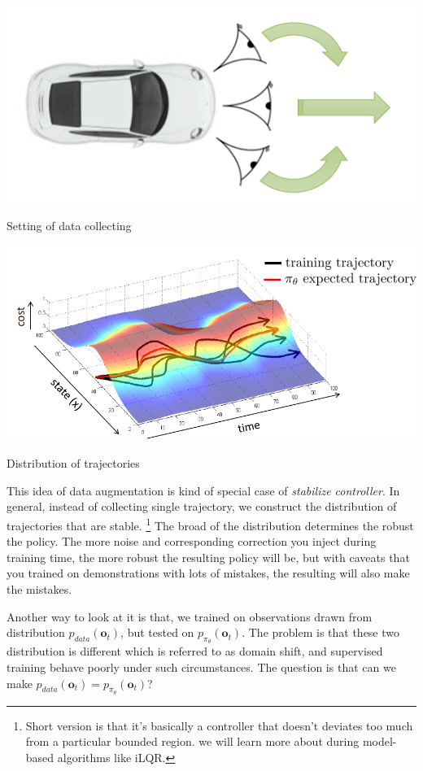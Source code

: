 \documentclass[nobib]{tufte-handout}
\begin{document}
\begin{marginfigure}
  \centering
  \includegraphics[width=\linewidth]{data-aug}
  \caption{Setting of data collecting}
  \label{fig:data-aug}
\end{marginfigure}

\begin{marginfigure}
  \centering
  \includegraphics[width=\linewidth]{stability}
  \caption{Distribution of trajectories}
  \label{fig:stability}
\end{marginfigure}

This idea of data augmentation is kind of special case of \emph{stabilize controller}. In general, instead of collecting single trajectory, we construct the distribution of trajectories that are stable. \thanks{Short version is that it's basically a controller that doesn't deviates too much from a particular bounded region. we will learn more about during model-based algorithms like iLQR.} The broad of the distribution determines the robust the policy. The more noise and corresponding correction you inject during training time, the more robust the resulting policy will be, but with caveats that you trained on demonstrations with lots of mistakes, the resulting will also make the mistakes.

Another way to look at it is that, we trained on observations drawn from distribution $p_{data}(\mathbf{o}_t)$, but tested on $p_{\pi_\theta}(\mathbf{o}_t)$. The problem is that these two distribution is different which is referred to as domain shift, and supervised training behave poorly under such circumstances. The question is that can we make $p_{data}(\mathbf{o}_t) = p_{\pi_\theta}(\mathbf{o}_t)$?
\end{document}
